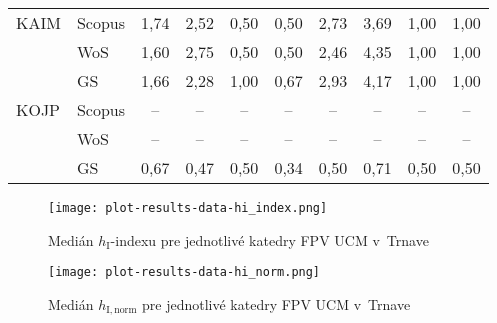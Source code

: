 {\begin{table}
\begin{tabularx}{\textwidth}{XXcccc@{\hspace{3ex}}cccc}
 KAIM & Scopus & 1,74     & 2,52 & 0,50 & 0,50 & 2,73    & 3,69 & 1,00 & 1,00 \\
      & WoS    & 1,60     & 2,75 & 0,50 & 0,50 & 2,46    & 4,35 & 1,00 & 1,00 \\
      & GS     & 1,66     & 2,28 & 1,00 & 0,67 & 2,93    & 4,17 & 1,00 & 1,00 \\[3ex]
 KOJP & Scopus & --       & --   & --   & --   & --      & --   & --   & --   \\
      & WoS    & --       & --   & --   & --   & --      & --   & --   & --   \\
      & GS     & 0,67     & 0,47 & 0,50 & 0,34 & 0,50    & 0,71 & 0,50 & 0,50 \\[0.5ex]
  \bottomrule
\end{tabularx}
\end{table}

\begin{figure}
  \centering
  \texttt{[image: plot-results-data-hi\_index.png]}
  \caption{Medián $h_{\mathrm{I}}$-indexu pre jednotlivé katedry FPV UCM v~Trnave}
  \label{fig:hi-index.plot}
\end{figure}

\begin{figure}
  \centering
  \texttt{[image: plot-results-data-hi\_norm.png]}
  \caption{Medián $h_{\mathrm{I,norm}}$ pre jednotlivé katedry FPV UCM v~Trnave}
  \label{fig:hinorm.plot}
\end{figure}


}
